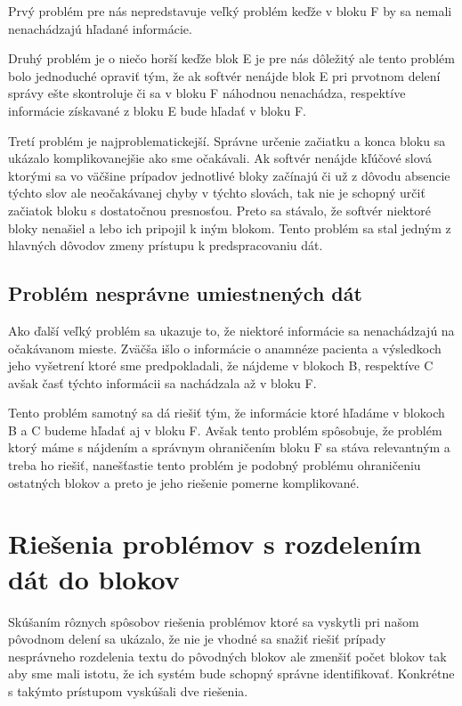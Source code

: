 Prvý problém pre nás nepredstavuje veľký problém keďže v bloku F by sa nemali nenachádzajú hľadané informácie. 

Druhý problém je o niečo horší keďže blok E je pre nás dôležitý ale tento problém bolo jednoduché opraviť tým, že ak softvér nenájde blok E pri prvotnom delení správy ešte skontroluje či sa v bloku F náhodnou nenachádza, respektíve informácie získavané z bloku E bude hľadať v bloku F.

Tretí problém je najproblematickejší. Správne určenie začiatku a konca bloku sa ukázalo komplikovanejšie ako sme očakávali. Ak softvér nenájde kľúčové slová ktorými sa vo väčšine prípadov jednotlivé bloky začínajú či už z dôvodu absencie týchto slov ale neočakávanej chyby v týchto slovách, tak nie je schopný určiť začiatok bloku s dostatočnou presnosťou. Preto sa stávalo, že softvér niektoré bloky nenašiel a lebo ich pripojil k iným blokom. Tento problém sa stal jedným z hlavných dôvodov zmeny prístupu k predspracovaniu dát.

\subsection{Problém nesprávne umiestnených dát}

Ako ďalší veľký problém sa ukazuje to, že niektoré informácie sa nenachádzajú na očakávanom mieste. Zväčša išlo o informácie o anamnéze pacienta a výsledkoch jeho vyšetrení ktoré sme predpokladali, že nájdeme v blokoch B, respektíve C avšak časť týchto informácii sa nachádzala až v bloku F.

Tento problém samotný sa dá riešiť tým, že informácie ktoré hľadáme v blokoch B a C budeme hľadať aj v bloku F. Avšak tento problém spôsobuje, že problém ktorý máme s nájdením a správnym ohraničením bloku F sa stáva relevantným a treba ho riešiť, nanešťastie tento problém je podobný problému ohraničeniu ostatných blokov a preto je jeho riešenie pomerne komplikované.

\section{Riešenia problémov s rozdelením dát do blokov}

Skúšaním rôznych spôsobov riešenia problémov ktoré sa vyskytli pri našom pôvodnom delení sa ukázalo, že nie je vhodné sa snažiť riešiť prípady nesprávneho rozdelenia textu do pôvodných blokov ale zmenšiť počet blokov tak aby sme mali istotu, že ich systém bude schopný správne identifikovať. Konkrétne s takýmto prístupom vyskúšali dve riešenia.

